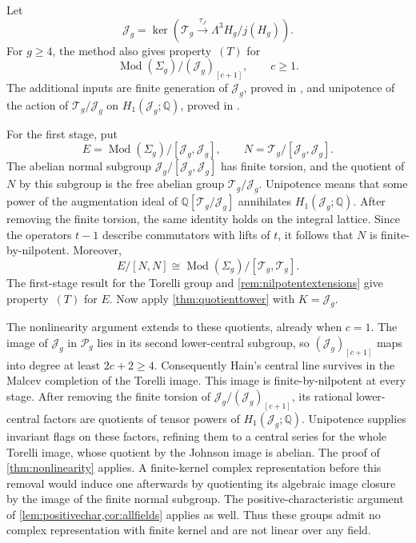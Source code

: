 \documentclass[11pt,a4paper]{article}
\theoremstyle{definition}
\newcommand{\Q}{\mathbb Q}
\newcommand{\Mod}{\operatorname{Mod}}
\newcommand{\rt}{(T)}
\begin{document}
Let
\[
 \mathcal J_g=\ker\!\left(\mathcal T_g
       \xrightarrow{\tau_J}\Lambda^3H_g/j(H_g)\right).
\]
For \(g\ge4\), the method also gives property~\(\rt\) for
\[
 \Mod(\Sigma_g)/(\mathcal J_g)_{[c+1]},\qquad c\ge1.
\]
The additional inputs are finite generation of \(\mathcal J_g\),
proved in \cite[Theorem~A]{ChurchErshovPutman}, and unipotence of
the action of \(\mathcal T_g/\mathcal J_g\) on
\(H_1(\mathcal J_g;\Q)\), proved in
\cite[Theorem~A]{DimcaHainPapadima}.

For the first stage, put
\[
 E=\Mod(\Sigma_g)/[\mathcal J_g,\mathcal J_g],
 \qquad N=\mathcal T_g/[\mathcal J_g,\mathcal J_g].
\]
The abelian normal subgroup \(\mathcal J_g/[\mathcal J_g,\mathcal J_g]\)
has finite torsion, and the quotient of \(N\) by this subgroup
is the free abelian group \(\mathcal T_g/\mathcal J_g\).
Unipotence means that some power of the augmentation ideal of
\(\Q[\mathcal T_g/\mathcal J_g]\) annihilates
\(H_1(\mathcal J_g;\Q)\). After removing the finite torsion,
the same identity holds on the integral lattice. Since the
operators \(t-1\) describe commutators with lifts of \(t\),
it follows that \(N\) is finite-by-nilpotent. Moreover,
\[
 E/[N,N]\cong\Mod(\Sigma_g)/[\mathcal T_g,\mathcal T_g].
\]
The first-stage result for the Torelli group and
\cref{rem:nilpotentextensions} give property~\(\rt\) for \(E\).
Now apply \cref{thm:quotienttower} with \(K=\mathcal J_g\).

The nonlinearity argument extends to these quotients, already
when \(c=1\). The image of \(\mathcal J_g\) in \(\mathscr P_g\)
lies in its second lower-central subgroup, so
\((\mathcal J_g)_{[c+1]}\) maps into degree at least \(2c+2\ge4\).
Consequently Hain's central line survives in the Malcev completion
of the Torelli image. This image is finite-by-nilpotent at every
stage. After removing the finite torsion of
\(\mathcal J_g/(\mathcal J_g)_{[c+1]}\), its rational
lower-central factors are quotients of tensor powers of
\(H_1(\mathcal J_g;\Q)\). Unipotence supplies invariant flags
on these factors, refining them to a central series for the
whole Torelli image, whose quotient by the Johnson image is
abelian. The proof of
\cref{thm:nonlinearity} applies. A finite-kernel complex
representation before this removal would induce one afterwards
by quotienting its algebraic image closure by the image of the
finite normal subgroup. The positive-characteristic argument
of \cref{lem:positivechar,cor:allfields} applies as well.
Thus these groups admit no complex representation with finite
kernel and are not linear over any field.
\end{document}
